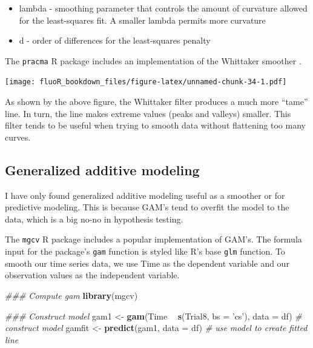 \documentclass[
]{book}
\newenvironment{Shaded}{\begin{snugshade}}{\end{snugshade}}
\newcommand{\CommentTok}[1]{\textcolor[rgb]{0.56,0.35,0.01}{\textit{#1}}}
\newcommand{\DataTypeTok}[1]{\textcolor[rgb]{0.13,0.29,0.53}{#1}}
\newcommand{\KeywordTok}[1]{\textcolor[rgb]{0.13,0.29,0.53}{\textbf{#1}}}
\newcommand{\NormalTok}[1]{#1}
\newcommand{\OperatorTok}[1]{\textcolor[rgb]{0.81,0.36,0.00}{\textbf{#1}}}
\newcommand{\StringTok}[1]{\textcolor[rgb]{0.31,0.60,0.02}{#1}}
\providecommand{\tightlist}{%
  \setlength{\itemsep}{0pt}\setlength{\parskip}{0pt}}
\begin{document}
\begin{itemize}
\tightlist
\item
  lambda - smoothing parameter that controls the amount of curvature allowed for the least-squares fit. A smaller lambda permits more curvature
\item
  d - order of differences for the least-squares penalty
\end{itemize}

The \texttt{pracma} R package includes an implementation of the Whittaker smoother \citep{borchers_pracma_2019}.

\begin{Shaded}
\end{Shaded}

\texttt{[image: fluoR\_bookdown\_files/figure-latex/unnamed-chunk-34-1.pdf]}

As shown by the above figure, the Whittaker filter produces a much more ``tame'' line. In turn, the line makes extreme values (peaks and valleys) smaller. This filter tends to be useful when trying to smooth data without flattening too many curves.

\hypertarget{vis-smoothing-gam}{%
\subsection{Generalized additive modeling}\label{vis-smoothing-gam}}

I have only found generalized additive modeling useful as a smoother or for predictive modeling. This is because GAM's tend to overfit the model to the data, which is a big no-no in hypothesis testing.

The \texttt{mgcv} R package includes a popular implementation of GAM's. The formula input for the package's \texttt{gam} function is styled like R's base \texttt{glm} function. To smooth our time series data, we use Time as the dependent variable and our observation values as the independent variable.

\begin{Shaded}
\begin{Highlighting}[]
\CommentTok{### Compute gam}
\KeywordTok{library}\NormalTok{(mgcv)}

\CommentTok{### Construct model}
\NormalTok{gam1 <-}\StringTok{ }\KeywordTok{gam}\NormalTok{(Time }\OperatorTok{~}\StringTok{ }\KeywordTok{s}\NormalTok{(Trial8, }\DataTypeTok{bs =} \StringTok{'cs'}\NormalTok{), }\DataTypeTok{data =}\NormalTok{ df) }\CommentTok{# construct model}
\NormalTok{gamfit <-}\StringTok{ }\KeywordTok{predict}\NormalTok{(gam1, }\DataTypeTok{data =}\NormalTok{ df) }\CommentTok{# use model to create fitted line}
\end{Highlighting}
\end{Shaded}
\end{document}
